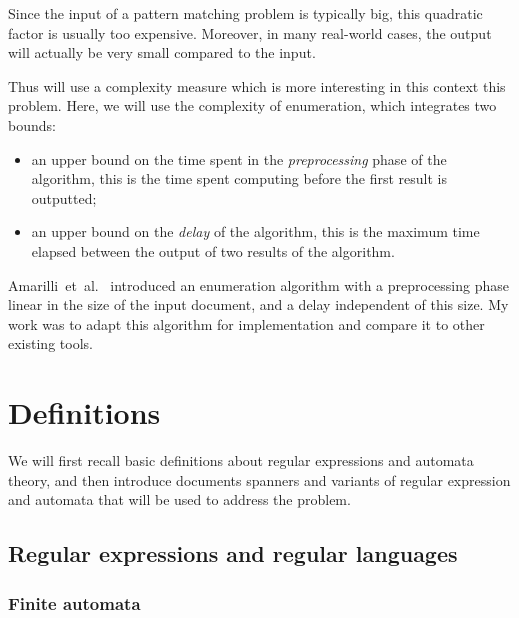 \documentclass[11px]{article}
\theoremstyle{definition}
\newcommand{\pierre}[1]{\textcolor{magenta}{[\textbf{Pierre:} #1]}}
\begin{document}
    Since the input of a pattern matching problem is typically big, this
    quadratic factor is usually too expensive. Moreover, in many real-world
    cases, the output will actually be very small compared to the input.

    Thus will use a complexity measure which is more interesting in this
    context this problem. Here, we will use the complexity of enumeration,
    which integrates two bounds:
    \begin{itemize}
      \item an upper bound on the time spent in the \textit{preprocessing}
        phase of the algorithm, this is the time spent computing before the
        first result is outputted;
      \item an upper bound on the \textit{delay} of the algorithm, this is
        the maximum time elapsed between the output of two results of the
        algorithm.
    \end{itemize}

    Amarilli~et~al.~\cite{ICDT19} introduced an enumeration algorithm with a
    preprocessing phase linear in the size of the input document, and a delay
    independent of this size. My work was to adapt this algorithm for
    implementation and compare it to other existing tools.



  \section{Definitions}

    We will first recall basic definitions about regular expressions and
    automata theory, and then introduce documents spanners and variants of
    regular expression and automata that will be used to address the problem.

    \subsection{Regular expressions and regular languages}

      \subsubsection{Finite automata}
\end{document}
